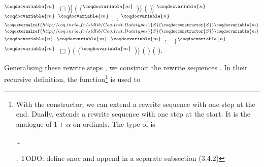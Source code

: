 \begin{singlespace}
\begin{coqdoccode}
$^\coqdocvariable{m}$
$\Box$)[
  (
($^\coqdocvariable{m}$
    )) (
)] 
$^\coqdocvariable{n}$
$^\coqdocvariable{m}$
$^\coqdocvariable{m}$
.\coqdoceol
\coqdocemptyline
\coqdocnoindent
{}
   :
$^\coqdocvariable{n}$
$^{\coqexternalref{http://coq.inria.fr/stdlib/Coq.Init.Datatypes}{S}{\coqdocconstructor{S}} \coqdocvariable{m}}$
$^{\coqexternalref{http://coq.inria.fr/stdlib/Coq.Init.Datatypes}{S}{\coqdocconstructor{S}}
\coqdocvariable{m}}$
 
$^\coqdocvariable{n}$
$^\coqdocvariable{m}$
$^\coqdocvariable{m}$
 :=\coqdoceol
\coqdocindent{1.00em}
($^\coqdocvariable{n}$
$^\coqdocvariable{m}$ $\Box$)
(
($^\coqdocvariable{m}$ ))
\coqdoclemma{\_}
(
  )
(
  ).\coqdoceol
\end{coqdoccode}
\end{singlespace}
Generalising these rewrite steps
, we construct
the rewrite sequences
. In their
recursive definition, the 
function\footnote{With the
   constructor, we
  can extend a rewrite sequence with one step at the end. Dually,
   extends a rewrite sequence
  with one step at the start. It is the analogue of $1 + \alpha$ on
  ordinals. The type of 
  is \begin{coqdoccode}\ldots\end{coqdoccode}. TODO: define snoc and
    append in a separate subsection (3.4.2)} is used to
